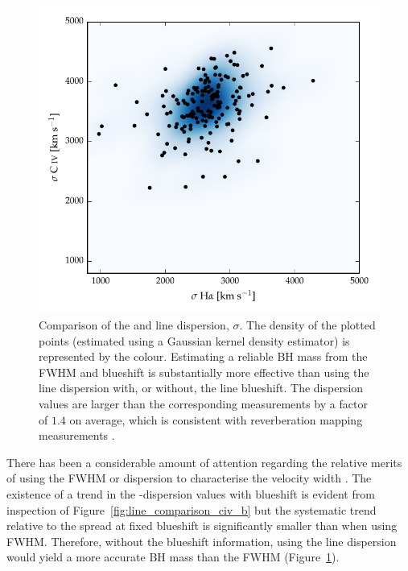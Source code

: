 \begin{figure}[h!]
    \centering
    \includegraphics[width=0.8\columnwidth]{figures/chapter03/dispersion_comparison.pdf}
    \caption[{Comparison of the  and \ha line dispersion}]{Comparison of the  and \ha line dispersion, $\sigma$. The density of the plotted points (estimated using a Gaussian kernel density estimator) is represented by the colour. Estimating a reliable BH mass from the  FWHM and blueshift is substantially more effective than using the  line dispersion with, or without, the line blueshift. The  dispersion values are larger than the corresponding \ha measurements by a factor of $1.4$ on average, which is consistent with reverberation mapping measurements \citep{vestergaard06}.}
    \label{fig:dispersion_comparison}
\end{figure}

There has been a considerable amount of attention regarding the relative merits of using the FWHM or dispersion to characterise the velocity width \citep[e.g.][]{denney13}.
The existence of a trend in the -dispersion values with  blueshift is evident from inspection of Figure~\ref{fig:line_comparison_civ_b} but the systematic trend relative to the spread at fixed blueshift is significantly smaller than when using  FWHM.
Therefore, without the blueshift information, using the line dispersion would yield a more accurate BH mass than the FWHM (Figure~\ref{fig:dispersion_comparison}).

